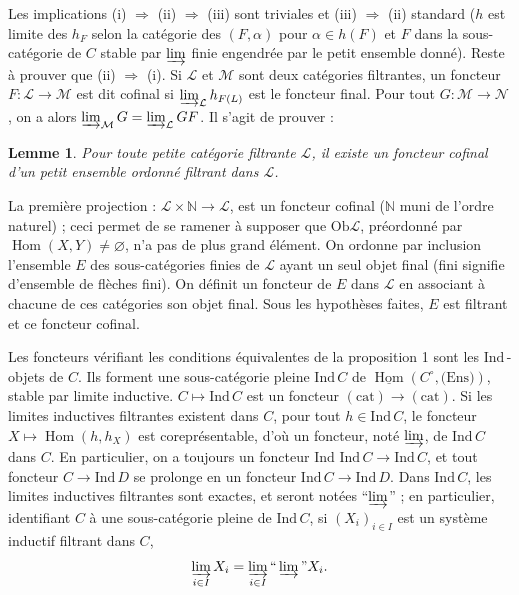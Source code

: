 \documentclass[12pt]{amsart}
\theoremstyle{plain}
\newtheorem{lem}{Lemme}
\theoremstyle{definition}
\DeclareMathOperator{\Hom}{Hom}
\newcommand{\Ind}{\text{Ind}\,}
\newcommand{\cL}{\mathcal{L}}
\newcommand{\cM}{\mathcal{M}}
\newcommand{\cN}{\mathcal{N}}
\newcommand{\cD}{D}
\begin{document}
Les implications (i) $\Rightarrow$ (ii) $\Rightarrow$ (iii) sont triviales et (iii) $\Rightarrow$ (ii) standard ($h$ est limite des $h_{F}$ selon la cat\'egorie des $(F,\alpha)$ pour $\alpha \in h(F)$ et $F$ dans la sous-cat\'egorie de $C$ stable par $\varinjlim$ finie engendr\'ee par le petit ensemble donn\'e). Reste \`a prouver que (ii) $\Rightarrow$ (i). Si $\cL$ et $\cM$ sont deux cat\'egories filtrantes, un foncteur $F: \cL \to \cM$ est dit cofinal si $\varinjlim_{\cL} h_{F(L)}$ est le foncteur final. Pour tout $G: \cM \to \cN$, on a alors $\varinjlim_{\cM} G = \varinjlim_{\cL} GF$. Il s'agit de prouver :

\begin{lem}
Pour toute petite cat\'egorie filtrante $\cL$, il existe un foncteur cofinal d'un petit ensemble ordonn\'e filtrant dans $\cL$.
\end{lem}

La premi\`ere projection : $\cL \times \mathbb{N} \to \cL$, est un foncteur cofinal ($\mathbb{N}$ muni de l'ordre naturel) ; ceci permet de se
ramener \`a supposer que $\text{Ob}\cL$, pr\'eordonn\'e par $\Hom(X,Y) \neq \varnothing$, n'a pas de plus grand \'el\'ement. On ordonne par inclusion l'ensemble $E$ des sous-cat\'egories finies de $\cL$ ayant un seul objet final (fini signifie d'ensemble de fl\`eches fini). On d\'efinit un foncteur de $E$ dans $\cL$ en associant \`a chacune de ces cat\'egories son objet final. Sous les hypoth\`eses faites, $E$ est filtrant et ce foncteur cofinal.

Les foncteurs v\'erifiant les conditions \'equivalentes de la proposition 1 sont les $\Ind$-objets de $C$. Ils forment une sous-cat\'egorie pleine $\Ind C$ de $\underline{\Hom}(C^{\circ},\text{(Ens)})$, stable par limite inductive. $C \mapsto \Ind C$ est un foncteur $(\text{cat}) \to (\text{cat})$. Si les limites inductives filtrantes existent dans $C$, pour tout $h \in \Ind C$, le foncteur $X \mapsto \Hom(h,h_{X})$ est corepr\'esentable, d'o\`u un foncteur, not\'e $\varinjlim$, de $\Ind C$ dans $C$. En particulier, on a toujours un foncteur $\Ind\,\Ind C \to \Ind C$, et tout foncteur $C \to \Ind\cD$ se prolonge en un foncteur $\Ind C \to \Ind\cD$. Dans $\Ind C$, les limites inductives filtrantes sont exactes, et seront not\'ees ``$\varinjlim$'' ; en particulier, identifiant $C$ \`a une sous-cat\'egorie pleine de $\Ind C$, si $(X_{i})_{i \in I}$ est un syst\`eme inductif filtrant dans $C$,
\[
\varinjlim_{i \in I} X_{i} = \varinjlim_{i \in I} \text{``}\varinjlim\text{''} X_{i}.
\]
\end{document}
